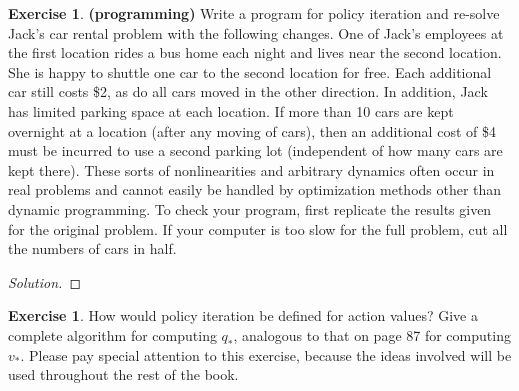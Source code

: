 \documentclass[oneside,11pt]{article}
\theoremstyle{definition}
\newtheorem{exer}[thm]{Exercise}
\newcommand{\qstar}{q_{\ast}}
\newcommand{\vstar}{v_{\ast}}
\newenvironment{solution}
{\renewcommand\qedsymbol{$\blacksquare$}\begin{proof}[Solution]} {\end{proof}}
\begin{document}
\begin{exer}
 \textbf{(programming)} Write a program for policy iteration and re-solve Jack's car rental problem with the following changes. One of Jack's employees at the first location rides a bus home each night and lives near the second location. She is happy to shuttle one car to the second location for free. Each additional car still costs \$2, as do all cars moved in the other direction. In addition, Jack has limited parking space at each location. If more than 10 cars are kept overnight at a location (after any moving of cars), then an additional cost of \$4 must be incurred to use a second parking lot (independent of how many cars are kept there). These sorts of nonlinearities and arbitrary dynamics often occur in real problems and cannot easily be handled by optimization methods other than dynamic programming. To check your program, first replicate the results given for the original problem. If your computer is too slow for the full problem, cut all the numbers of cars in half.
\end{exer}

\begin{shaded}
\begin{solution} 


\end{solution} 
\end{shaded}


\begin{exer}
How would policy iteration be defined for action values? Give a complete algorithm for computing $\qstar$, analogous to that on page 87 for computing $\vstar$. Please pay special attention to this exercise, because the ideas involved will be used throughout the rest of the book.
\end{exer}
\end{document}
